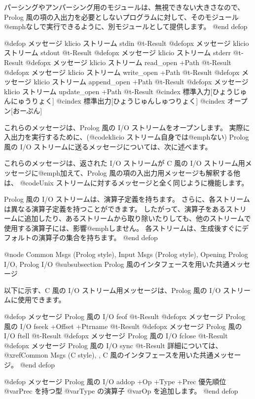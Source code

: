 {{{{パーシングやアンパーシング用のモジュールは、無視できない大きさなので、Prolog 風の項の入出力を必要としないプログラムに対して、そのモジュール@emph{なし}で実行できるように、別モジュールとして提供します。
@end defop

@defop {メッセージ} {klicio ストリーム} stdin @t{-}Result
@defopx {メッセージ} {klicio ストリーム} stdout @t{-}Result
@defopx {メッセージ} {klicio ストリーム} stderr @t{-}Result
@defopx {メッセージ} {klicio ストリーム} read_open +Path @t{-}Result
@defopx {メッセージ} {klicio ストリーム} write_open +Path @t{-}Result
@defopx {メッセージ} {klicio ストリーム} append_open +Path @t{-}Result
@defopx {メッセージ} {klicio ストリーム} update_open +Path @t{-}Result
@cindex 標準入力[ひょうじゅんにゅうりょく]
@cindex 標準出力[ひょうじゅんしゅつりょく]
@cindex オープン[おーぷん]

これらのメッセージは、Prolog 風の I/O ストリームをオープンします。
実際に入出力を実行するために、(@code{klicio} ストリーム自身では@emph{ない}) Prolog 風の I/O ストリームに送るメッセージについては、次に述べます。

これらのメッセージは、返された I/O ストリームが C 風の I/O ストリーム用メッセージに@emph{加えて}、Prolog 風の項の入出力用メッセージも解釈する他は、 @code{Unix} ストリームに対するメッセージと全く同じように機能します。

Prolog 風の I/O ストリームは、演算子定義を持ちます。
さらに、各ストリームは異なる演算子定義を持つことができます。
したがって、演算子をあるストリームに追加したり、あるストリームから取り除いたりしても、他のストリームで使用する演算子には、影響@emph{しません}。
各ストリームは、生成後すぐにデフォルトの演算子の集合を持ちます。
@end defop

@node Common Msgs (Prolog style), Input Msgs (Prolog style), Opening Prolog I/O, Prolog I/O
@subsubsection Prolog 風のインタフェースを用いた共通メッセージ

以下に示す、C 風の I/O ストリーム用メッセージは、Prolog 風の I/O ストリームに使用できます。

@defop {メッセージ} {Prolog 風の I/O }  feof @t{-}Result
@defopx {メッセージ} {Prolog 風の I/O }  fseek +Offset +Ptrname @t{-}Result
@defopx {メッセージ} {Prolog 風の I/O }  ftell @t{-}Result
@defopx {メッセージ} {Prolog 風の I/O }  fclose @t{-}Result
@defopx {メッセージ} {Prolog 風の I/O }  sync @t{-}Result
詳細については、@xref{Common Msgs (C style), ,
C 風のインタフェースを用いた共通メッセージ}。
@end defop

@defop {メッセージ} {Prolog 風の I/O }  addop +Op +Type +Prec
優先順位 @var{Prec} を持つ型 @var{Type} の演算子 @var{Op} を追加します。
@end defop

}}}}
